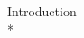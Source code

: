 \atstartofhistorysection
{\center \normalsize \huge Introduction\\ *\par}


\atendofhistorysection
\cleardoublepage
